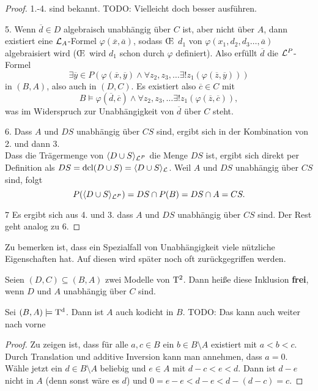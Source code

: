 \begin{proof}
	1.-4. sind bekannt. TODO: Vielleicht doch besser ausführen.
	\item[5.] Wenn $\overline{d}\in D$ algebraisch unabhängig über $C$ ist, aber nicht über $A$, dann existiert eine $\mathcal{L}_A$-Formel $\varphi(\overline{x},\overline{a})$, sodass \OE\ $d_1$ von $\varphi(x_1,d_2,d_3\dots,\overline{a})$ algebraisiert wird (\OE\ wird $d_1$ schon durch $\varphi$ definiert). Also erfüllt $\overline{d}$ die $\mathcal{L}^P$-Formel $$\exists \overline{y}\in P(\varphi(\overline{x},\overline{y})\land\forall z_2,z_3,\dots\exists! z_1(\varphi(\overline{z},\overline{y})))$$ in $(B,A)$, also auch in $(D,C)$. Es existiert also $\overline{c}\in C$ mit $$B\models\varphi(\overline{d},\overline{c})\land\forall z_2,z_3,\dots\exists! z_1(\varphi(\overline{z},\overline{c})),$$ was im Widerspruch zur Unabhängigkeit von $\overline{d}$ über $C$ steht.
	\item[6.] Dass $A$ und $DS$ unabhängig über $CS$ sind, ergibt sich in der Kombination von 2. und dann 3.\\
	Dass die Trägermenge von $\langle D\cup S\rangle_{\mathcal{L}^P}$ die Menge $DS$ ist, ergibt sich direkt per Definition als $DS=\operatorname{dcl}(D\cup S)=\langle D\cup S\rangle_{\mathcal{L}}$. Weil $A$ und $DS$ unabhängig über $CS$ sind, folgt $$P(\langle D\cup S\rangle_{\mathcal{L}^P})=DS\cap P(B)=DS\cap A=CS.$$
	\item[7] Es ergibt sich aus 4. und 3. dass $A$ und $DS$ unabhängig über $CS$ sind. Der Rest geht analog zu 6.
\end{proof}

Zu bemerken ist, dass ein Spezialfall von Unabhängigkeit viele nützliche Eigenschaften hat. Auf diesen wird später noch oft zurückgegriffen werden.
\begin{definition}
	Seien $(D,C)\subseteq(B,A)$ zwei Modelle von $\operatorname{T^2}$. Dann heiße diese Inklusion \textbf{frei}, wenn $D$ und $A$ unabhängig über $C$ sind.
\end{definition}

\begin{lemma}\label{Kodichte von A}
	Sei $(B,A)\models\operatorname{T^d}$. Dann ist $A$ auch kodicht in $B$. TODO: Das kann auch weiter nach vorne
\end{lemma}
\begin{proof}
	Zu zeigen ist, dass für alle $a,c\in B$ ein $b\in B\setminus A$ existiert mit $a<b<c$. Durch Translation und additive Inversion kann man annehmen, dass $a=0$. Wähle jetzt ein $d\in B\setminus A$ beliebig und $e\in A$ mit $d-c<e<d$. Dann ist $d-e$ nicht in $A$ (denn sonst wäre es $d$) und $0=e-e<d-e<d-(d-c)=c$.
\end{proof}


